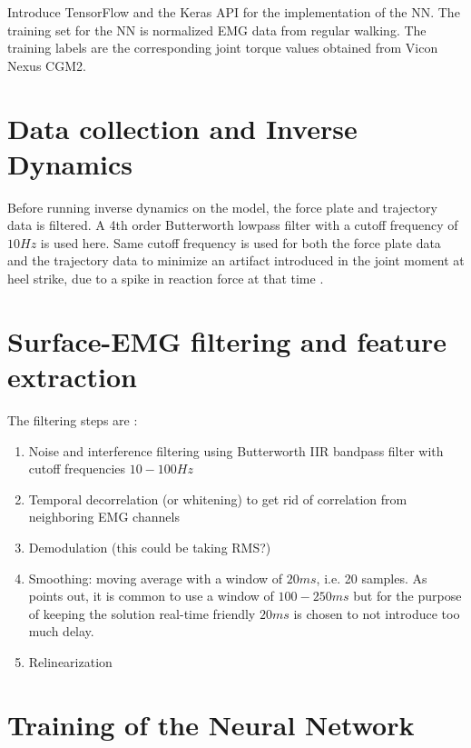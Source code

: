 \documentclass[../main.tex]{subfiles}
\begin{document}
Introduce TensorFlow and the Keras API for the implementation of the \ac{NN}.
The training set for the \ac{NN} is normalized EMG data from regular walking.
The training labels are the corresponding joint torque values obtained from Vicon Nexus CGM2.

\section{Data collection and Inverse Dynamics}
Before running inverse dynamics on the model, the force plate and trajectory data is filtered. A 4th order Butterworth lowpass filter with a cutoff frequency of $10Hz$ is used here. Same cutoff frequency is used for both the force plate data and the trajectory data to minimize an artifact introduced in the joint moment at heel strike, due to a spike in reaction force at that time \cite{Kristianslund2012}.

\section{Surface-EMG filtering and feature extraction}
The filtering steps are \parencite[99]{Clancy2016}:
\begin{enumerate}
    \item Noise and interference filtering using Butterworth IIR bandpass filter with cutoff frequencies $10-100Hz$
    \item Temporal decorrelation (or whitening) to get rid of correlation from neighboring EMG channels
    \item Demodulation (this could be taking RMS?)
    \item Smoothing: moving average with a window of $20ms$, i.e. 20 samples. As \citeauthor{Clancy2016} points out, it is common to use a window of $100-250 ms$ but for the purpose of keeping the solution real-time friendly $20ms$ is chosen to not introduce too much delay.
    \item Relinearization
\end{enumerate}

\section{Training of the Neural Network}
\end{document}
